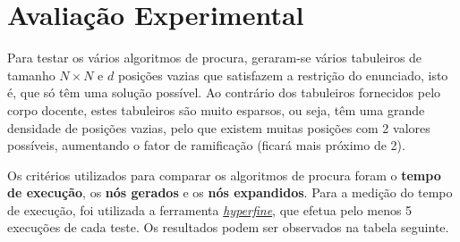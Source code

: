 \documentclass[12pt,a4paper]{article}
\begin{document}
\section{Avaliação Experimental}

Para testar os vários algoritmos de procura, geraram-se vários tabuleiros de tamanho \(N \times N\)
e \(d\) posições vazias que satisfazem a restrição do enunciado, isto é, que só têm uma solução possível.
Ao contrário dos tabuleiros fornecidos pelo corpo docente, estes tabuleiros são muito
esparsos, ou seja, têm uma grande densidade de posições vazias, pelo que existem muitas
posições com 2 valores possíveis, aumentando o fator de ramificação (ficará mais próximo de 2).

Os critérios utilizados para comparar os algoritmos de procura foram o \textbf{tempo de execução},
os \textbf{nós gerados} e os \textbf{nós expandidos}.
Para a medição do tempo de execução, foi utilizada a ferramenta \href{https://github.com/sharkdp/hyperfine}{\textit{hyperfine}},
que efetua pelo menos 5 execuções de cada teste.
Os resultados podem ser observados na tabela seguinte.
\end{document}

